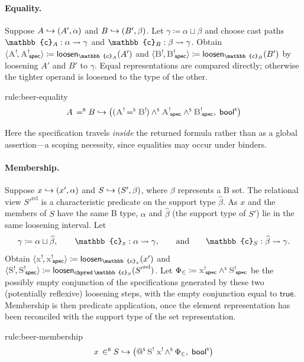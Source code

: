 \paragraph{Equality.}
Suppose \(A \mathrel{\hookrightarrow} (A', \alpha)\) and \(B \mathrel{\hookrightarrow} (B', \beta)\).
Let \(\gamma \coloneq \alpha \sqcup \beta\) and choose cast paths \(\mathbb{c}_A : \castpath{\alpha}{\gamma}\) and \(\mathbb{c}_B : \castpath{\beta}{\gamma}\).
Obtain \(\langle\lvar{A},\spec{\lvar{A}}\rangle \coloneq \mathsf{loosen}_{\mathbb{c}_A}(A')\) and \(\langle\lvar{B},\spec{\lvar{B}}\rangle \coloneq \mathsf{loosen}_{\mathbb{c}_B}(B')\) by loosening \(A'\) and \(B'\) to \(\gamma\).
Equal representations are compared directly; otherwise the tighter operand is loosened to the type of the other.
\begin{encrule}[equality]{rule:beer-equality}
\[
  A \eqB B \encto \bigl((\lvar{A} \eqS \lvar{B}) \andS \spec{\lvar{A}} \andS \spec{\lvar{B}},\; \boolS\bigr)
\]
\end{encrule}
Here the specification travels \emph{inside} the returned formula rather than as a global assertion---a scoping necessity, since equalities may occur under binders.

\paragraph{Membership.}
Suppose \(x \mathrel{\hookrightarrow} (x', \alpha)\) and \(S \mathrel{\hookrightarrow} (S', \beta)\), where \(\beta\) represents a B set.
The relational view \({S'}^{\mathrm{rel}}\) is a characteristic predicate on the support type \(\widehat{\beta}\).
As \(x\) and the members of \(S\) have the same B type, \(\alpha\) and \(\widehat{\beta}\) (the support type of \(S'\)) lie in the same loosening interval.
Let
\[
  \gamma \coloneq \alpha \sqcup \widehat{\beta},
  \qquad
  \mathbb{c}_x : \castpath{\alpha}{\gamma},
  \qquad\text{and}\qquad
  \mathbb{c}_S : \castpath{\widehat{\beta}}{\gamma}.
\]
Obtain
\(
  \langle\lvar{x},\spec{\lvar{x}}\rangle
  \coloneq \mathsf{loosen}_{\mathbb{c}_x}(x')
\)
and
\(
  \langle\lvar{S},\spec{\lvar{S}}\rangle
  \coloneq \mathsf{loosen}_{\mathtt{chpred}\,\mathbb{c}_S}({S'}^{\mathrm{rel}})
\).
Let \(\Phi_{\in} \coloneq \spec{\lvar{x}} \andS \spec{\lvar{S}}\) be the possibly empty conjunction of the specifications generated by these two (potentially reflexive) loosening steps, with the empty conjunction equal to \(\mathsf{true}\).
Membership is then predicate application, once the element representation has been reconciled with the support type of the set representation.
\begin{encrule}[membership]{rule:beer-membership}
\[
  x \inB S \encto
  \bigl(\appS{\lvar{S}}{\lvar{x}} \andS \Phi_{\in},\;\boolS\bigr)
\]
\end{encrule}

